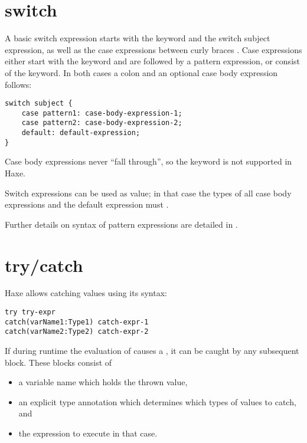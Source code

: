 \section{switch}
\label{expression-switch}

A basic switch expression starts with the  keyword and the switch subject expression, as well as the case expressions between curly braces \expr{\{\}}. Case expressions either start with the  keyword and are followed by a pattern expression, or consist of the  keyword. In both cases a colon \expr{:} and an optional case body expression follows:

\begin{lstlisting}
switch subject {
	case pattern1: case-body-expression-1;
	case pattern2: case-body-expression-2;
	default: default-expression;
}
\end{lstlisting}

Case body expressions never ``fall through'', so the  keyword is not supported in Haxe.

Switch expressions can be used as value; in that case the types of all case body expressions and the default expression must .

Further details on syntax of pattern expressions are detailed in .

\section{try/catch}
\label{expression-try-catch}

Haxe allows catching values using its  syntax:

\begin{lstlisting}
try try-expr
catch(varName1:Type1) catch-expr-1
catch(varName2:Type2) catch-expr-2
\end{lstlisting}

If during runtime the evaluation of  causes a , it can be caught by any subsequent  block. These blocks consist of

\begin{itemize}
	\item a variable name which holds the thrown value,
	\item an explicit type annotation which determines which types of values to catch, and
	\item the expression to execute in that case.
\end{itemize}

